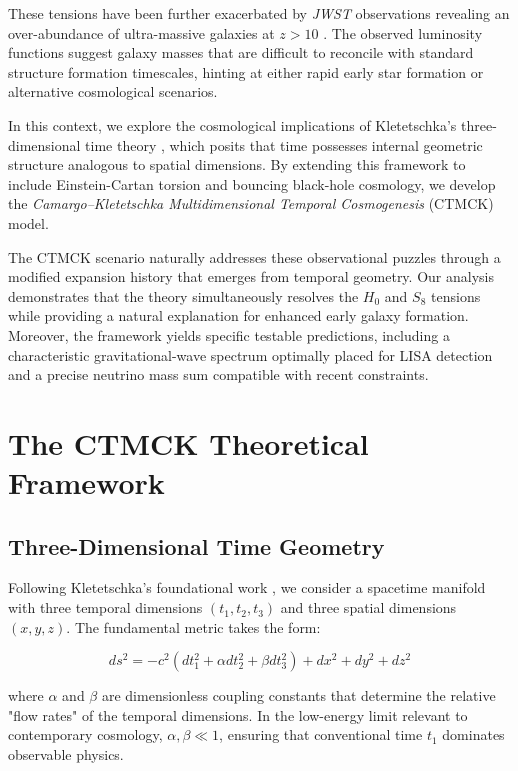 \documentclass[reprint,amsmath,amssymb,aps,prd,nofootinbib,longbibliography]{revtex4-2}
\begin{document}
These tensions have been further exacerbated by \textit{JWST} observations revealing an over-abundance of ultra-massive galaxies at $z > 10$ \cite{Naidu2022,BoylanKolchin2023}. The observed luminosity functions suggest galaxy masses that are difficult to reconcile with standard structure formation timescales, hinting at either rapid early star formation or alternative cosmological scenarios.

In this context, we explore the cosmological implications of Kletetschka's three-dimensional time theory \cite{Kletetschka2021}, which posits that time possesses internal geometric structure analogous to spatial dimensions. By extending this framework to include Einstein-Cartan torsion and bouncing black-hole cosmology, we develop the \textit{Camargo–Kletetschka Multidimensional Temporal Cosmogenesis} (CTMCK) model.

The CTMCK scenario naturally addresses these observational puzzles through a modified expansion history that emerges from temporal geometry. Our analysis demonstrates that the theory simultaneously resolves the $H_0$ and $S_8$ tensions while providing a natural explanation for enhanced early galaxy formation. Moreover, the framework yields specific testable predictions, including a characteristic gravitational-wave spectrum optimally placed for \textsc{LISA} detection and a precise neutrino mass sum compatible with recent constraints.

\section{The CTMCK Theoretical Framework}

\subsection{Three-Dimensional Time Geometry}

Following Kletetschka's foundational work \cite{Kletetschka2021}, we consider a spacetime manifold with three temporal dimensions $(t_1, t_2, t_3)$ and three spatial dimensions $(x, y, z)$. The fundamental metric takes the form:

\begin{equation}
ds^2 = -c^2(dt_1^2 + \alpha dt_2^2 + \beta dt_3^2) + dx^2 + dy^2 + dz^2
\label{eq:metric6d}
\end{equation}

where $\alpha$ and $\beta$ are dimensionless coupling constants that determine the relative "flow rates" of the temporal dimensions. In the low-energy limit relevant to contemporary cosmology, $\alpha, \beta \ll 1$, ensuring that conventional time $t_1$ dominates observable physics.
\end{document}
